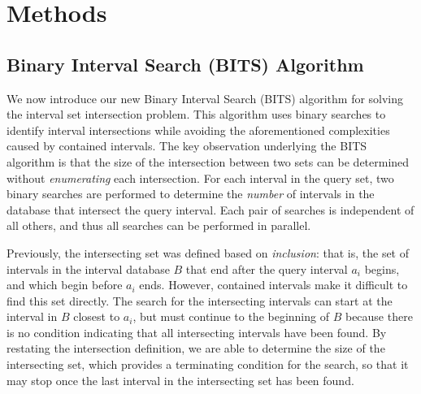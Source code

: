 \documentclass{bioinfo}
\begin{document}
	

	



	\section{Methods}
	
	\subsection{Binary Interval Search (BITS) Algorithm}
	We now introduce our new Binary Interval Search (BITS) algorithm for solving
	the interval set intersection problem.  This algorithm uses binary searches
	to identify interval intersections while avoiding the aforementioned
	complexities caused by contained intervals. The key observation underlying the BITS 
	algorithm is that the size of the intersection between two sets can be 
	determined without \emph{enumerating} each intersection.  For each interval 
	in the query set, two binary searches are performed to determine the \emph{number} 
	of intervals in the database that intersect the query interval.  Each pair of
	searches is independent of all others, and thus all searches can be
	performed in parallel.  
	
	Previously, the intersecting set was defined based on \emph{inclusion}:
	that is, the set of intervals in the interval database $B$ that end after the query
	interval $a_i$ begins, and which begin before $a_i$ ends.  However,
	contained intervals make it difficult to find this set directly.  The
	search for the intersecting intervals can start at the interval in $B$
	closest to $a_i$, but must continue to the beginning of $B$ because
	there is no condition indicating that all intersecting intervals have
	been found.  By restating the intersection definition, we are able to
	determine the size of the intersecting set, which provides a
	terminating condition for the search, so that it may stop once the
	last interval in the intersecting set has been found.
\end{document}

